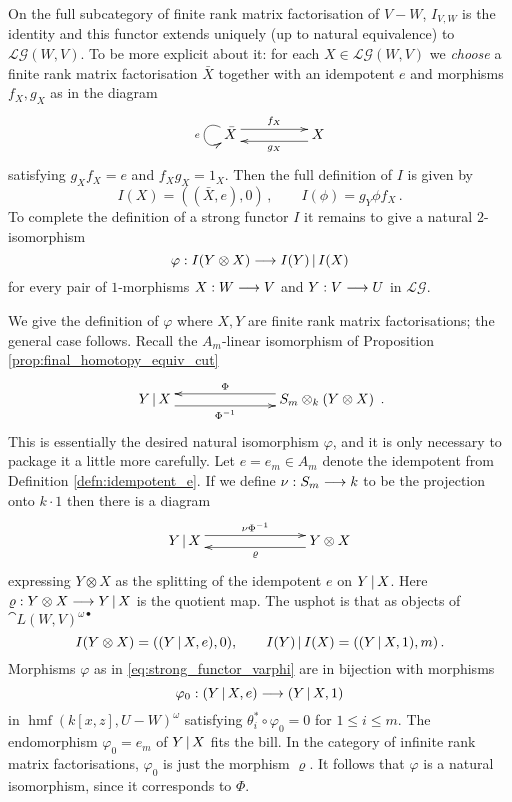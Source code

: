 \documentclass[english,letter paper,12pt,leqno]{article}
\theoremstyle{example}
\numberwithin{equation}{section}
\def\LG{\mathcal{LG}}
\DeclareMathOperator{\hmf}{hmf}
\begin{document}
On the full subcategory of finite rank matrix factorisation of $V - W$, $I_{V,W}$ is the identity and this functor extends uniquely (up to natural equivalence) to $\LG(W,V)$. To be more explicit about it: for each $X \in \LG(W,V)$ we \emph{choose} a finite rank matrix factorisation $\bar{X}$ together with an idempotent $e$ and morphisms $f_X, g_X$ as in the diagram
\[
\xymatrix@C+2pc{
\bar{X} \ar@(ul,dl)_-{e} \ar@<1ex>[r]^-{f_X} & X \ar@<1ex>[l]^-{g_X}
}
\]
satisfying $g_X f_X = e$ and $f_X g_X = 1_X$. Then the full definition of $I$ is given by
\[
I( X ) = ((\bar{X}, e), 0)\,, \qquad I( \phi ) = g_Y \phi f_X\,.
\]
To complete the definition of a strong functor $I$ it remains to give a natural $2$-isomorphism
\begin{equation}\label{eq:strong_functor_varphi}
\varphi: I(Y \otimes X) \longrightarrow I(Y) \,|\, I(X)
\end{equation}
for every pair of $1$-morphisms $X: W \longrightarrow V$ and $Y: V \longrightarrow U$ in $\LG$. 

We give the definition of $\varphi$ where $X,Y$ are finite rank matrix factorisations; the general case follows. Recall the $A_m$-linear isomorphism of Proposition \ref{prop:final_homotopy_equiv_cut}
\begin{equation}\label{eq:cutmodelequiv}
\xymatrix@C+4pc{
Y \l X \ar@<-1ex>[r]_-{\Phi^{-1}} & S_m \otimes_k ( Y \otimes X )\ar@<-1ex>[l]_-{\Phi}
}\,.
\end{equation}
This is essentially the desired natural isomorphism $\varphi$, and it is only necessary to package it a little more carefully. Let $e = e_m \in A_m$ denote the idempotent from Definition \ref{defn:idempotent_e}. If we define $\nu: S_m \longrightarrow k$ to be the projection onto $k \cdot 1$ then there is a diagram
\[
\xymatrix@C+4pc{
Y \l X \ar@<1ex>[r]^-{\nu \Phi^{-1}} & Y \otimes X \ar@<1ex>[l]^-{\varrho}
}
\]
expressing $Y \otimes X$ as the splitting of the idempotent $e$ on $Y \,|\, X$. Here $\varrho: Y \otimes X \longrightarrow Y \,|\, X$ is the quotient map. The usphot is that as objects of $\cat{L}(W,V)^{\omega \bullet}$
\[
I(Y \otimes X) = ((Y\,|\, X, e), 0), \qquad I(Y) \,|\, I(X) = ( (Y \,|\, X, 1), m )\,.
\]
Morphisms $\varphi$ as in \eqref{eq:strong_functor_varphi} are in bijection with morphisms
\[
\varphi_0: (Y \,|\, X, e) \longrightarrow (Y\,|\, X, 1)
\]
in $\hmf(k[x,z], U - W)^{\omega}$ satisfying $\theta_i^* \circ \varphi_0 = 0$ for $1 \le i \le m$. The endomorphism $\varphi_0 = e_m$ of $Y \,|\, X$ fits the bill. In the category of infinite rank matrix factorisations, $\varphi_0$ is just the morphism $\varrho$. It follows that $\varphi$ is a natural isomorphism, since it corresponds to $\Phi$.
\end{document}
